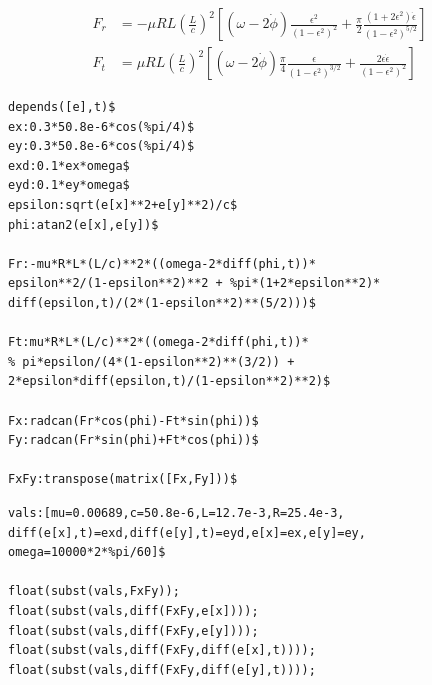 \documentclass[12pt,usenames,pdftex]{beamer}
\begin{document}
\begin{frame}
  \begin{equation*}
    \begin{split}
      F_r &= -\mu RL{\left(\frac{L}{c}\right)}^2 \left[
        (\omega-2\dot{\phi}) \frac{\epsilon^2}{{(1-\epsilon^2)}^2} +
        \frac{\pi}{2}\frac{(1+2\epsilon^2)\dot{\epsilon}}{{(1-\epsilon^2)}^{5/2}}
      \right]\\
      F_t &= \mu RL{\left(\frac{L}{c}\right)}^2 \left[ (\omega-2\dot{\phi})
        \frac{\pi}{4}\frac{\epsilon}{{(1-\epsilon^2)}^{3/2}} +
        \frac{2\epsilon\dot{\epsilon}}{{(1-\epsilon^2)}^2} \right]
    \end{split}
  \end{equation*}
  \vspace{-0.5cm}
\begin{lstlisting}[basicstyle=\small]
depends([e],t)$
ex:0.3*50.8e-6*cos(%pi/4)$
ey:0.3*50.8e-6*cos(%pi/4)$
exd:0.1*ex*omega$
eyd:0.1*ey*omega$
epsilon:sqrt(e[x]**2+e[y]**2)/c$
phi:atan2(e[x],e[y])$

Fr:-mu*R*L*(L/c)**2*((omega-2*diff(phi,t))*
epsilon**2/(1-epsilon**2)**2 + %pi*(1+2*epsilon**2)*
diff(epsilon,t)/(2*(1-epsilon**2)**(5/2)))$

Ft:mu*R*L*(L/c)**2*((omega-2*diff(phi,t))*
% pi*epsilon/(4*(1-epsilon**2)**(3/2)) +
2*epsilon*diff(epsilon,t)/(1-epsilon**2)**2)$ 

Fx:radcan(Fr*cos(phi)-Ft*sin(phi))$
Fy:radcan(Fr*sin(phi)+Ft*cos(phi))$

FxFy:transpose(matrix([Fx,Fy]))$
\end{lstlisting}
\begin{lstlisting}[basicstyle=\small]
vals:[mu=0.00689,c=50.8e-6,L=12.7e-3,R=25.4e-3,
diff(e[x],t)=exd,diff(e[y],t)=eyd,e[x]=ex,e[y]=ey,
omega=10000*2*%pi/60]$

float(subst(vals,FxFy));
float(subst(vals,diff(FxFy,e[x])));
float(subst(vals,diff(FxFy,e[y])));
float(subst(vals,diff(FxFy,diff(e[x],t))));
float(subst(vals,diff(FxFy,diff(e[y],t))));

\end{lstlisting}
\end{frame}
\end{document}
